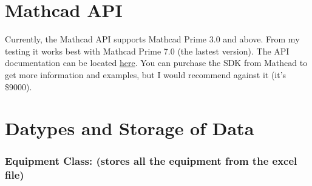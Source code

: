 \documentclass[11pt]{article}
\begin{document}
\section{Mathcad API}
\label{sec:org70ebe8f}
Currently, the Mathcad API supports Mathcad Prime 3.0 and above. From my testing it works best with Mathcad Prime 7.0 (the lastest version). The API documentation can be located \href{https://support.ptc.com/help/mathcad/r7.0/en/index.html\#page/PTC\_Mathcad\_Help\%2Fmathcad\_and\_automation\_api.html\%23}{here}. You can purchase the SDK from Mathcad to get more information and examples, but I would recommend against it (it's \$9000).
\section{Datypes and Storage of Data}
\label{sec:orgf8c7d8f}
\subsubsection{Equipment Class: (stores all the equipment from the excel file)}
\label{sec:org08cddcd}
\end{document}
